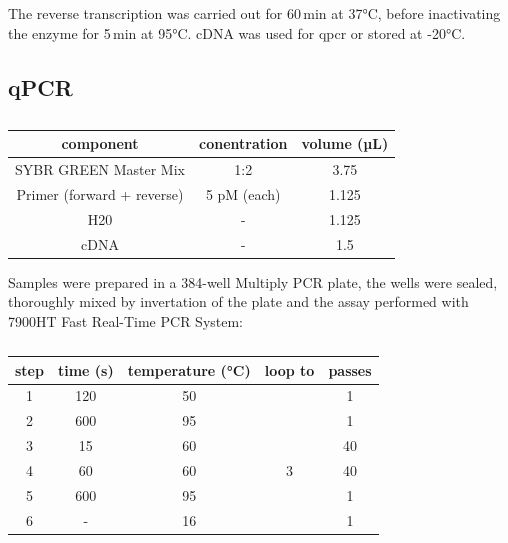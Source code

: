     The reverse transcription was carried out for 60\,min at 37°C, before inactivating the enzyme for 5\,min at 95°C. cDNA was used for \ac{qpcr} or stored at -20°C.

    \subsection{qPCR}
    \begin{table}[h]
    \capstart
	\centering
	\begin{minipage}{\captionwidth}
	   	\caption[qPCR samples]{}
	   	\label{tab:qPCR_samples}
	\end{minipage}
    \begin{tabular}{|c|c|c|}
        \hline
        component                  & conentration & volume (µL) \\ \hline
        SYBR GREEN Master Mix      & 1:2          & 3.75        \\
        Primer (forward + reverse) & 5 pM (each)  & 1.125       \\
        H20                        & -            & 1.125       \\
        cDNA                       & -            & 1.5           \\ \hline
    \end{tabular}
    \end{table}
    Samples were prepared in a 384-well Multiply PCR plate, the wells were sealed, thoroughly mixed by invertation of the plate and the assay performed with 7900HT Fast Real-Time PCR System:

    \begin{table}[h]
    \capstart
    \centering
    \begin{minipage}{\captionwidth}
        \caption[qPCR programme]{}
        \label{tab:qPCR_programme}
    \end{minipage}
    \begin{tabular}{|c|c|c|c|c|}
    \hline
        step & time (s) & temperature (°C) & loop to & passes \\ \hline
        1    & 120      & 50               &         & 1      \\
        2    & 600      & 95               &         & 1      \\
        3    & 15       & 60               &         & 40     \\
        4    & 60       & 60               & 3       & 40     \\
        5    & 600      & 95               &         & 1      \\
        6    & -        & 16               &         & 1      \\ \hline
    \end{tabular}
    \end{table}

